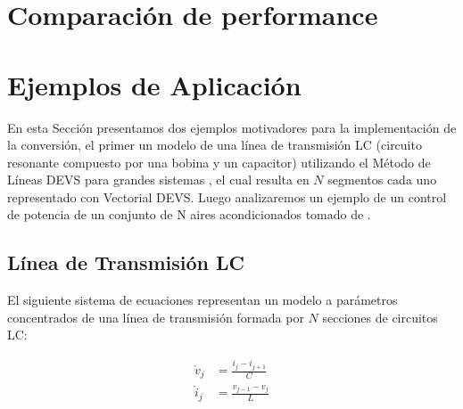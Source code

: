 \documentclass[a4paper,	11pt]{report}
\begin{document}
\section{Comparación de performance}


%
%
%
%


\section{Ejemplos de Aplicación}
En esta Sección presentamos dos ejemplos motivadores para la implementación de la conversión, el primer un modelo de una línea de transmisión LC (circuito resonante compuesto por una bobina y un capacitor) utilizando el Método de Líneas DEVS para grandes sistemas \cite{Cel06}, el cual resulta en $N$ segmentos cada uno representado con Vectorial DEVS. Luego analizaremos un ejemplo de un control de potencia de un conjunto de N aires acondicionados tomado de \cite{PKBW12}.

\subsection{Línea de Transmisión LC}
El siguiente sistema de ecuaciones representan un modelo a parámetros concentrados de una línea de transmisión formada por $N$ secciones de circuitos LC:

\begin{equation*}
\begin{split}
\dot{v}_{j} &= \frac{i_{j} - i_{j+1}}{C} \\
\dot{i}_{j} &= \frac{v_{j-1} - v_{j}}{L} \\	
\end{split}
\end{equation*}
\end{document}
